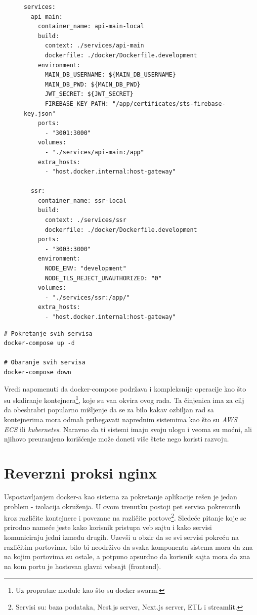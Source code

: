 \documentclass[12pt,oneside]{memoir}
\begin{document}
\begin{figure}[h]
\begin{lstlisting}[language=docker-compose, caption={docker-compose konfiguracija nekih razvojnih servisa.}, label={lst:dockercomposelocal}]
services:
  api_main:
    container_name: api-main-local
    build:
      context: ./services/api-main
      dockerfile: ./docker/Dockerfile.development
    environment:
      MAIN_DB_USERNAME: ${MAIN_DB_USERNAME}
      MAIN_DB_PWD: ${MAIN_DB_PWD}
      JWT_SECRET: ${JWT_SECRET}
      FIREBASE_KEY_PATH: "/app/certificates/sts-firebase-key.json"
    ports:
      - "3001:3000"
    volumes:
      - "./services/api-main:/app"
    extra_hosts:
      - "host.docker.internal:host-gateway"

  ssr:
    container_name: ssr-local
    build:
      context: ./services/ssr
      dockerfile: ./docker/Dockerfile.development
    ports:
      - "3003:3000"
    environment:
      NODE_ENV: "development"
      NODE_TLS_REJECT_UNAUTHORIZED: "0"
    volumes:
      - "./services/ssr:/app/"
    extra_hosts:
      - "host.docker.internal:host-gateway"
\end{lstlisting}
\end{figure}

\newpage
\begin{lstlisting}[caption={docker-compose komande.}, label={lst:dockerlocalcommands}]
# Pokretanje svih servisa
docker-compose up -d 

# Obaranje svih servisa
docker-compose down
\end{lstlisting}

Vredi napomenuti da docker-compose podržava i kompleksnije operacije kao što su skaliranje kontejnera\footnote{Uz propratne module kao što su docker-swarm.}, koje su van okvira ovog rada. Ta činjenica ima za cilj da obeshrabri popularno mišljenje da se za bilo kakav ozbiljan rad sa kontejnerima mora odmah pribegavati naprednim sistemima kao što su \textit{AWS ECS} ili \textit{kubernetes}. Naravno da ti sistemi imaju svoju ulogu i veoma su moćni, ali njihovo preuranjeno korišćenje može doneti više štete nego koristi razvoju.


\section{Reverzni proksi nginx}

Uspostavljanjem docker-a kao sistema za pokretanje aplikacije rešen je jedan problem - izolacija okruženja. U ovom trenutku postoji pet servisa pokrenutih kroz različite kontejnere i povezane na različite portove\footnote{Servisi su: baza podataka, Nest.js server, Next.js server, ETL i streamlit.}. Sledeće pitanje koje se prirodno nameće jeste kako korisnik pristupa veb sajtu i kako servisi komuniciraju jedni između drugih. Uzevši u obzir da se svi servisi pokreću na različitim portovima, bilo bi neodrživo da svaka komponenta sistema mora da zna na kojim portovima su ostale, a potpuno apsurdno da korisnik sajta mora da zna na kom portu je hostovan glavni vebsajt (frontend).
\end{document}
